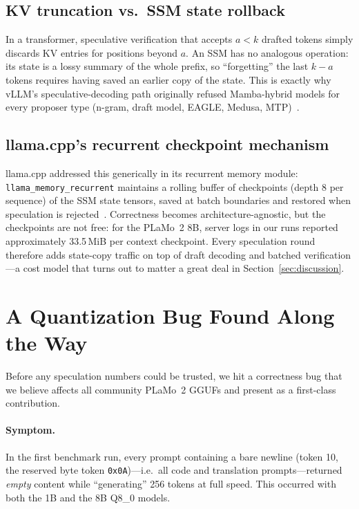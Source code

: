 \documentclass[10pt]{article}
\newcommand{\code}[1]{\texttt{#1}}
\begin{document}
\subsection{KV truncation vs.\ SSM state rollback}

In a transformer, speculative verification that accepts $a < k$ drafted
tokens simply discards KV entries for positions beyond $a$. An SSM has no
analogous operation: its state is a lossy summary of the whole prefix, so
``forgetting'' the last $k-a$ tokens requires having saved an earlier copy
of the state. This is exactly why vLLM's speculative-decoding path
originally refused Mamba-hybrid models for every proposer type (n-gram,
draft model, EAGLE, Medusa, MTP)~\cite{vllmissue}.

\subsection{llama.cpp's recurrent checkpoint mechanism}

llama.cpp addressed this generically in its recurrent memory module:
\code{llama\_memory\_recurrent} maintains a rolling buffer of checkpoints
(depth 8 per sequence) of the SSM state tensors, saved at batch boundaries
and restored when speculation is rejected~\cite{llamacpppr}. Correctness
becomes architecture-agnostic, but the checkpoints are not free: for the
PLaMo~2 8B, server logs in our runs reported approximately 33.5\,MiB per
context checkpoint. Every speculation round therefore adds state-copy
traffic on top of draft decoding and batched verification---a cost model
that turns out to matter a great deal in Section~\ref{sec:discussion}.

\section{A Quantization Bug Found Along the Way}
\label{sec:bug}

Before any speculation numbers could be trusted, we hit a correctness bug
that we believe affects all community PLaMo~2 GGUFs and present as a
first-class contribution.

\paragraph{Symptom.} In the first benchmark run, every prompt containing a
bare newline (token 10, the reserved byte token \code{0x0A})---i.e.\ all
code and translation prompts---returned \emph{empty} content while
``generating'' 256 tokens at full speed. This occurred with both the 1B and
the 8B Q8\_0 models.
\end{document}
